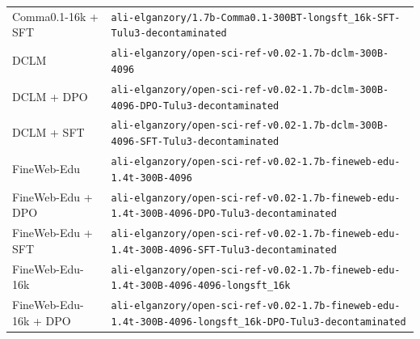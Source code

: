 \begin{table}[ht]
\begin{tabular}{lp{10cm}}
Comma0.1-16k + SFT & \texttt{ali-\allowbreak{}elganzory/\allowbreak{}1.7b-\allowbreak{}Comma0.1-\allowbreak{}300BT-\allowbreak{}longsft\_16k-\allowbreak{}SFT-\allowbreak{}Tulu3-\allowbreak{}decontaminated} \\
DCLM & \texttt{ali-\allowbreak{}elganzory/\allowbreak{}open-\allowbreak{}sci-\allowbreak{}ref-\allowbreak{}v0.02-\allowbreak{}1.7b-\allowbreak{}dclm-\allowbreak{}300B-\allowbreak{}4096} \\
DCLM + DPO & \texttt{ali-\allowbreak{}elganzory/\allowbreak{}open-\allowbreak{}sci-\allowbreak{}ref-\allowbreak{}v0.02-\allowbreak{}1.7b-\allowbreak{}dclm-\allowbreak{}300B-\allowbreak{}4096-\allowbreak{}DPO-\allowbreak{}Tulu3-\allowbreak{}decontaminated} \\
DCLM + SFT & \texttt{ali-\allowbreak{}elganzory/\allowbreak{}open-\allowbreak{}sci-\allowbreak{}ref-\allowbreak{}v0.02-\allowbreak{}1.7b-\allowbreak{}dclm-\allowbreak{}300B-\allowbreak{}4096-\allowbreak{}SFT-\allowbreak{}Tulu3-\allowbreak{}decontaminated} \\
FineWeb-Edu & \texttt{ali-\allowbreak{}elganzory/\allowbreak{}open-\allowbreak{}sci-\allowbreak{}ref-\allowbreak{}v0.02-\allowbreak{}1.7b-\allowbreak{}fineweb-\allowbreak{}edu-\allowbreak{}1.4t-\allowbreak{}300B-\allowbreak{}4096} \\
FineWeb-Edu + DPO & \texttt{ali-\allowbreak{}elganzory/\allowbreak{}open-\allowbreak{}sci-\allowbreak{}ref-\allowbreak{}v0.02-\allowbreak{}1.7b-\allowbreak{}fineweb-\allowbreak{}edu-\allowbreak{}1.4t-\allowbreak{}300B-\allowbreak{}4096-\allowbreak{}DPO-\allowbreak{}Tulu3-\allowbreak{}decontaminated} \\
FineWeb-Edu + SFT & \texttt{ali-\allowbreak{}elganzory/\allowbreak{}open-\allowbreak{}sci-\allowbreak{}ref-\allowbreak{}v0.02-\allowbreak{}1.7b-\allowbreak{}fineweb-\allowbreak{}edu-\allowbreak{}1.4t-\allowbreak{}300B-\allowbreak{}4096-\allowbreak{}SFT-\allowbreak{}Tulu3-\allowbreak{}decontaminated} \\
FineWeb-Edu-16k & \texttt{ali-\allowbreak{}elganzory/\allowbreak{}open-\allowbreak{}sci-\allowbreak{}ref-\allowbreak{}v0.02-\allowbreak{}1.7b-\allowbreak{}fineweb-\allowbreak{}edu-\allowbreak{}1.4t-\allowbreak{}300B-\allowbreak{}4096-\allowbreak{}4096-\allowbreak{}longsft\_16k} \\
FineWeb-Edu-16k + DPO & \texttt{ali-\allowbreak{}elganzory/\allowbreak{}open-\allowbreak{}sci-\allowbreak{}ref-\allowbreak{}v0.02-\allowbreak{}1.7b-\allowbreak{}fineweb-\allowbreak{}edu-\allowbreak{}1.4t-\allowbreak{}300B-\allowbreak{}4096-\allowbreak{}longsft\_16k-\allowbreak{}DPO-\allowbreak{}Tulu3-\allowbreak{}decontaminated} \\

\end{tabular}
\end{table}
